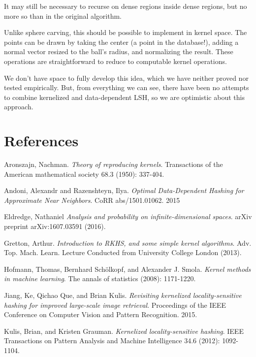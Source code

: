 \documentclass[twoside,11pt]{homework}
\begin{document}
\begin{multicols}{2}
It may still be necessary to recurse on dense regions inside dense
regions, but no more so than in the original algorithm.

Unlike sphere carving, this should be possible to implement in kernel
space.  The points can be drawn by taking the center (a point in the
database!), adding a normal vector resized to the ball's radius, and
normalizing the result.  These operations are straightforward to
reduce to computable kernel operations.

We don't have space to fully develop this idea, which we have neither
proved nor tested empirically.  But, from everything we can see, there
have been no attempts to combine kernelized and data-dependent LSH, so
we are optimistic about this approach.

\end{multicols}
\newpage
\section*{References}
\beginrefs

 Aronszajn, Nachman. \emph{Theory of reproducing kernels}. Transactions of the American mathematical society 68.3 (1950): 337-404.

 Andoni, Alexandr and Razenshteyn, Ilya. \emph{Optimal Data-Dependent Hashing for Approximate Near Neighbors}. CoRR abs/1501.01062. 2015

 Eldredge, Nathaniel \emph{Analysis and probability on infinite-dimensional spaces}. arXiv preprint arXiv:1607.03591 (2016).

 Gretton, Arthur. \emph{Introduction to RKHS, and some simple kernel algorithms}. Adv. Top. Mach. Learn. Lecture Conducted from University College London (2013).

 Hofmann, Thomas, Bernhard Schölkopf, and Alexander J. Smola. \emph{Kernel methods in machine learning}. The annals of statistics (2008): 1171-1220.

 Jiang, Ke, Qichao Que, and Brian Kulis. \emph{Revisiting kernelized locality-sensitive hashing for improved large-scale image retrieval}. Proceedings of the IEEE Conference on Computer Vision and Pattern Recognition. 2015.
  
 Kulis, Brian, and Kristen Grauman. \emph{Kernelized locality-sensitive hashing}. IEEE Transactions on Pattern Analysis and Machine Intelligence 34.6 (2012): 1092-1104.
\end{document}
